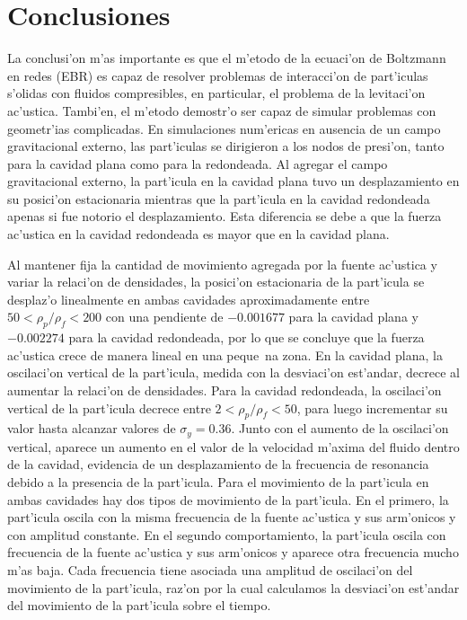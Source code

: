 \section{Conclusiones}
\label{sec:conclusiones}

La conclusi'on m'as importante es que el m'etodo de la ecuaci'on de Boltzmann en redes (EBR)
es capaz de resolver problemas de interacci'on de part'iculas s'olidas con fluidos compresibles,
en particular, el problema de la levitaci'on ac'ustica. Tambi'en, el m'etodo demostr'o ser capaz
de simular problemas con geometr'ias complicadas. En simulaciones num'ericas en ausencia de
un campo gravitacional externo, las part'iculas se dirigieron a los nodos de presi'on, tanto 
para la cavidad plana como para la redondeada.  Al agregar el campo gravitacional externo, la
part'icula en la cavidad plana tuvo un desplazamiento en su posici'on estacionaria
 mientras que la part'icula en la cavidad redondeada apenas si fue
notorio el desplazamiento. Esta diferencia se debe a que la fuerza ac'ustica en la cavidad
redondeada es mayor que en la cavidad plana.


Al mantener fija la cantidad de movimiento agregada por la fuente
ac'ustica y variar la relaci'on de densidades, la posici'on estacionaria de la part'icula se desplaz'o
linealmente en ambas cavidades aproximadamente entre $50< \rho_p/\rho_f <200$ con una pendiente
de $-0.001677$ para la cavidad plana y $-0.002274$ para la cavidad redondeada, por lo que
se concluye que la fuerza ac'ustica crece de manera lineal en una
peque~na zona. En la cavidad plana, la 
oscilaci'on vertical de la part'icula, medida con la desviaci'on est'andar, decrece al aumentar la relaci'on de
densidades. Para la cavidad redondeada, la oscilaci'on vertical de la part'icula decrece entre
 $2< \rho_p/\rho_f <50$, para luego incrementar su valor hasta alcanzar valores de $\sigma_y=0.36$.
Junto con el aumento de la oscilaci'on vertical, aparece un aumento en el valor de la 
velocidad m'axima del fluido dentro de la cavidad, evidencia de un  desplazamiento de la
frecuencia de resonancia debido a la presencia de la part'icula. Para el movimiento de la part'icula
en ambas cavidades hay dos tipos de movimiento de la part'icula. En el primero, la part'icula
oscila con la misma frecuencia de la fuente ac'ustica  y sus arm'onicos 
y con amplitud constante. En el segundo comportamiento, la part'icula oscila con frecuencia 
de la fuente ac'ustica y sus arm'onicos y aparece otra frecuencia mucho m'as baja. Cada frecuencia
tiene asociada una amplitud de oscilaci'on del movimiento de la part'icula, raz'on por la cual calculamos 
la desviaci'on est'andar del movimiento de la part'icula sobre el tiempo.


